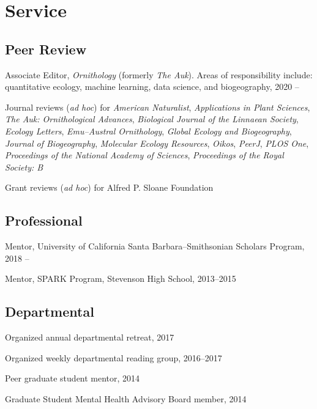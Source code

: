 \documentclass[letterpaper]{article}
\newenvironment{biblist}{%
   \begin{list}{}{%
     \setlength{\labelwidth}{0pt}%
     \setlength{\labelsep}{1em}%
     \setlength{\leftmargin}{2em}%
     \setlength{\itemindent}{-1em}%
   }
}{\end{list}}
\begin{document}
\section*{Service}
\subsection*{Peer Review}
\begin{biblist}
\item Associate Editor, \emph{Ornithology} (formerly \emph{The Auk}). Areas of responsibility include: quantitative ecology, machine learning, data science, and biogeography, 2020 --
\item Journal reviews (\emph{ad hoc}) for \emph{American Naturalist},  \emph{Applications in Plant Sciences}, \emph{The Auk: Ornithological Advances}, \emph{Biological Journal of the Linnaean Society}, \emph{Ecology Letters}, \emph{Emu--Austral Ornithology}, \emph{Global Ecology and Biogeography}, \emph{Journal of Biogeography}, \emph{Molecular Ecology Resources}, \emph{Oikos}, \emph{PeerJ}, \emph{PLOS One}, \emph{Proceedings of the National Academy of Sciences}, \emph{Proceedings of the Royal Society: B}
\item Grant reviews (\emph{ad hoc}) for Alfred P. Sloane Foundation
\end{biblist}
\subsection*{Professional}
\begin{biblist}
\item Mentor, University of California Santa Barbara--Smithsonian Scholars Program, 2018 --
\item Mentor, SPARK Program, Stevenson High School, 2013--2015
\end{biblist}
\subsection*{Departmental}
\begin{biblist}
\item Organized annual departmental retreat, 2017
\item Organized weekly departmental reading group, 2016--2017
\item Peer graduate student mentor, 2014
\item Graduate Student Mental Health Advisory Board member, 2014
\end{biblist}
\end{document}
